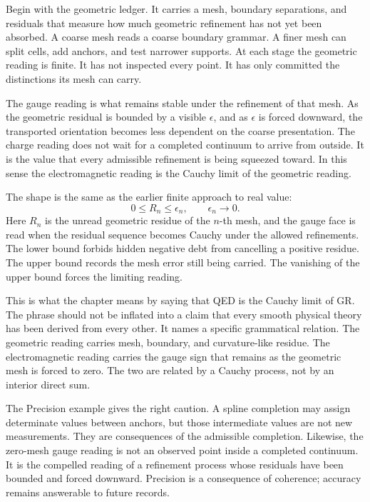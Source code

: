 Begin with the geometric ledger. It carries a mesh, boundary separations,
and residuals that measure how much geometric refinement has not yet been
absorbed. A coarse mesh reads a coarse boundary grammar. A finer mesh can
split cells, add anchors, and test narrower supports. At each stage the
geometric reading is finite. It has not inspected every point. It has only
committed the distinctions its mesh can carry.

The gauge reading is what remains stable under the refinement of that mesh.
As the geometric residual is bounded by a visible \(\epsilon\), and as
\(\epsilon\) is forced downward, the transported orientation becomes less
dependent on the coarse presentation. The charge reading does not wait for a
completed continuum to arrive from outside. It is the value that every
admissible refinement is being squeezed toward. In this sense the
electromagnetic reading is the Cauchy limit of the geometric reading.

The shape is the same as the earlier finite approach to real value:
\[
  0 \leq R_n \leq \epsilon_n,
  \qquad \epsilon_n \to 0 .
\]
Here \(R_n\) is the unread geometric residue of the \(n\)-th mesh, and the
gauge face is read when the residual sequence becomes Cauchy under the
allowed refinements. The lower bound forbids hidden negative debt from
cancelling a positive residue. The upper bound records the mesh error still
being carried. The vanishing of the upper bound forces the limiting reading.

This is what the chapter means by saying that QED is the Cauchy limit of GR.
The phrase should not be inflated into a claim that every smooth physical
theory has been derived from every other. It names a specific grammatical
relation. The geometric reading carries mesh, boundary, and curvature-like
residue. The electromagnetic reading carries the gauge sign that remains as
the geometric mesh is forced to zero. The two are related by a Cauchy
process, not by an interior direct sum.

The Precision example gives the right caution. A spline completion may
assign determinate values between anchors, but those intermediate values are
not new measurements. They are consequences of the admissible completion.
Likewise, the zero-mesh gauge reading is not an observed point inside a
completed continuum. It is the compelled reading of a refinement process
whose residuals have been bounded and forced downward. Precision is a
consequence of coherence; accuracy remains answerable to future records.

